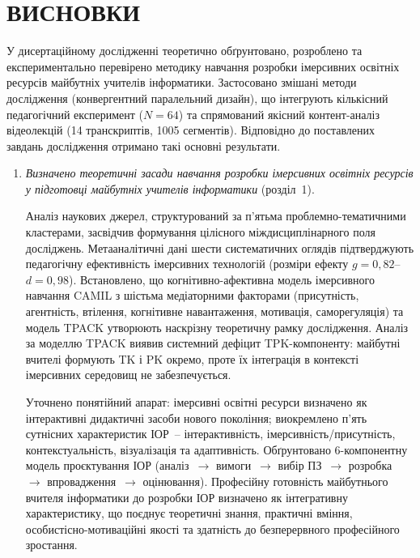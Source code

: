 \section*{\centering ВИСНОВКИ}

У дисертаційному дослідженні теоретично обґрунтовано, розроблено та експериментально перевірено методику навчання розробки імерсивних освітніх ресурсів майбутніх учителів інформатики. Застосовано змішані методи дослідження (конвергентний паралельний дизайн), що інтегрують кількісний педагогічний експеримент ($N = 64$) та спрямований якісний контент-аналіз відеолекцій (14 транскриптів, 1005 сегментів). Відповідно до поставлених завдань дослідження отримано такі основні результати.

\begin{enumerate}[label=\arabic*.]

\item \textit{Визначено теоретичні засади навчання розробки імерсивних освітніх ресурсів у підготовці майбутніх учителів інформатики} (розділ~1).

Аналіз наукових джерел, структурований за п'ятьма проблемно-тематичними кластерами, засвідчив формування цілісного міждисциплінарного поля досліджень. Метааналітичні дані шести систематичних оглядів підтверджують педагогічну ефективність імерсивних технологій (розміри ефекту $g=0{,}82$--$d=0{,}98$). Встановлено, що когнітивно-афективна модель імерсивного навчання CAMIL з шістьма медіаторними факторами (присутність, агентність, втілення, когнітивне навантаження, мотивація, саморегуляція) та модель TPACK утворюють наскрізну теоретичну рамку дослідження. Аналіз за моделлю TPACK виявив системний дефіцит TPK-компоненту: майбутні вчителі формують TK і PK окремо, проте їх інтеграція в контексті імерсивних середовищ не забезпечується.

Уточнено понятійний апарат: імерсивні освітні ресурси визначено як інтерактивні дидактичні засоби нового покоління; виокремлено п'ять сутнісних характеристик ІОР~-- інтерактивність, імерсивність/присутність, контекстуальність, візуалізація та адаптивність. Обґрунтовано 6-компонентну модель проєктування ІОР (аналіз~$\to$ вимоги~$\to$ вибір ПЗ~$\to$ розробка~$\to$ впровадження~$\to$ оцінювання). Професійну готовність майбутнього вчителя інформатики до розробки ІОР визначено як інтегративну характеристику, що поєднує теоретичні знання, практичні вміння, особистісно-мотиваційні якості та здатність до безперервного професійного зростання.


\end{enumerate}
